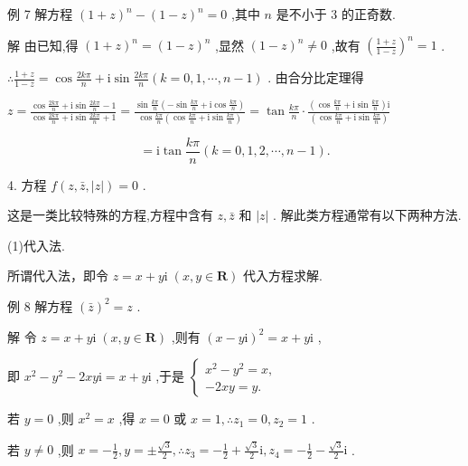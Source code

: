 \documentclass[10pt]{article}
\begin{document}
例 7 解方程 \({\left( 1 + z\right) }^{n} - {\left( 1 - z\right) }^{n} = 0\) ,其中 \(n\) 是不小于 3 的正奇数.

解 由已知,得 \({\left( 1 + z\right) }^{n} = {\left( 1 - z\right) }^{n}\) ,显然 \({\left( 1 - z\right) }^{n} \neq  0\) ,故有 \({\left( \frac{1 + z}{1 - z}\right) }^{n} = 1\) .

\(\therefore \frac{1 + z}{1 - z} = \cos \frac{2k\pi }{n} + \mathrm{i}\sin \frac{2k\pi }{n}\left( {k = 0,1,\cdots ,n - 1}\right)\) . 由合分比定理得

\(z = \frac{\cos \frac{2k\pi }{n} + \mathrm{i}\sin \frac{2k\pi }{n} - 1}{\cos \frac{2k\pi }{n} + \mathrm{i}\sin \frac{2k\pi }{n} + 1} = \frac{\sin \frac{k\pi }{n}\left( {-\sin \frac{k\pi }{n} + \mathrm{i}\cos \frac{k\pi }{n}}\right) }{\cos \frac{k\pi }{n}\left( {\cos \frac{k\pi }{n} + \mathrm{i}\sin \frac{k\pi }{n}}\right) } = \tan \frac{k\pi }{n} \cdot  \frac{\left( {\cos \frac{k\pi }{n} + \mathrm{i}\sin \frac{k\pi }{n}}\right) \mathrm{i}}{\left( \cos \frac{k\pi }{n} + \mathrm{i}\sin \frac{k\pi }{n}\right) }\)

\[
= \mathrm{i}\tan \frac{k\pi }{n}\left( {k = 0,1,2,\cdots ,n - 1}\right) .
\]

4. 方程 \(f\left( {z,\bar{z},\left| z\right| }\right)  = 0\) .

这是一类比较特殊的方程,方程中含有 \(z,\bar{z}\) 和 \(\left| z\right|\) . 解此类方程通常有以下两种方法.

(1)代入法.

所谓代入法，即令 \(z = x + y\mathrm{i}\;\left( {x,y \in  \mathbf{R}}\right)\) 代入方程求解.

例 8 解方程 \({\left( \bar{z}\right) }^{2} = z\) .

解 令 \(z = x + y\mathrm{i}\;\left( {x,y \in  \mathbf{R}}\right)\) ,则有 \({\left( x - y\mathrm{i}\right) }^{2} = x + y\mathrm{i}\) ,

即 \({x}^{2} - {y}^{2} - {2xy}\mathrm{i} = x + y\mathrm{i}\) ,于是 \(\left\{  \begin{array}{l} {x}^{2} - {y}^{2} = x, \\   - {2xy} = y. \end{array}\right.\)

若 \(y = 0\) ,则 \({x}^{2} = x\) ,得 \(x = 0\) 或 \(x = 1,\therefore {z}_{1} = 0,{z}_{2} = 1\) .

若 \(y \neq  0\) ,则 \(x =  - \frac{1}{2},y =  \pm  \frac{\sqrt{3}}{2},\therefore {z}_{3} =  - \frac{1}{2} + \frac{\sqrt{3}}{2}\mathrm{i},{z}_{4} =  - \frac{1}{2} - \frac{\sqrt{3}}{2}\mathrm{i}\) .
\end{document}

